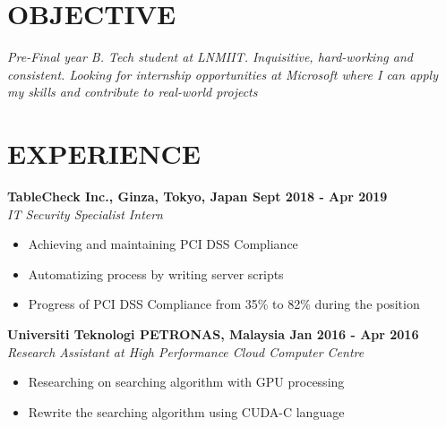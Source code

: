 \documentclass[margin]{res}
\begin{document}
\address{
\\\url{Github : https://www.github.com/louiszhenyean}
\\\url{Hackthebox : https://www.hackthebox.eu/profile/223593}
\\}
\address{
\\louiszhenyean@gmail.com
\\(+60) 19-567 5808
\\ \\}
\begin{resume}
\section{OBJECTIVE}
{\sl Pre-Final year B. Tech student at LNMIIT. Inquisitive, hard-working and consistent. Looking for internship opportunities at Microsoft where I can apply my skills and contribute to real-world projects}
\section{EXPERIENCE}
\textbf{TableCheck Inc., Ginza, Tokyo, Japan 
\hfill{Sept 2018 - Apr 2019}} \\
{\sl IT Security Specialist Intern} \vspace{-0.3cm} \\
    \begin{itemize}
        \item Achieving and maintaining PCI DSS Compliance
        \item Automatizing process by writing server scripts
        \item Progress of PCI DSS Compliance from 35\% to 82\% during the position
    \end{itemize}
\textbf{Universiti Teknologi PETRONAS, Malaysia
\hfill{Jan 2016 - Apr 2016}} \\
{\sl Research Assistant at High Performance Cloud Computer Centre} \vspace{-0.3cm} \\
    \begin{itemize}
        \item Researching on searching algorithm with GPU processing
        \item Rewrite the searching algorithm using CUDA-C language
    \end{itemize}

\end{resume}
\end{document}
